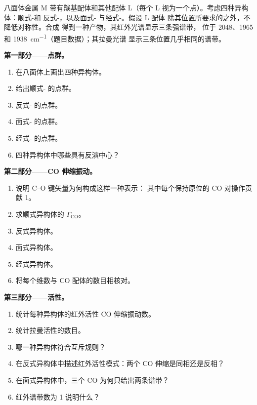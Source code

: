 \begin{problem}
\label{pb:b3:group-theory-applied:1}
八面体金属 M 带有羰基配体和其他配体 L（每个 L
视为一个点）。考虑四种异构体：顺式-和
反式-，以及面式- 与经式-。假设 L 配体
除其位置所要求的之外，不降低对称性。合成
 得到一种产物，其红外光谱显示三条强谱带，
位于 2048、1965 和 \qty{1938}{cm^{-1}}（题目数据）；其拉曼光谱
显示三条位置几乎相同的谱带。

\medskip\noindent\textbf{第一部分——点群。}
\begin{enumerate}
  \item 在八面体上画出四种异构体。
  \item 给出顺式- 的点群。
  \item 反式- 的点群。
  \item 面式- 的点群。
  \item 经式- 的点群。
  \item 四种异构体中哪些具有反演中心？
\end{enumerate}

\medskip\noindent\textbf{第二部分——CO 伸缩振动。}
\begin{enumerate}[resume]
  \item 说明 C--O 键矢量为何构成这样一种表示：
        其中每个保持原位的 CO 对操作贡献 1。
  \item 求顺式异构体的 $\Gamma_{\mathrm{CO}}$。
  \item 反式异构体。
  \item 面式异构体。
  \item 经式异构体。
  \item 将每个维数与 CO 配体的数目相核对。
\end{enumerate}

\medskip\noindent\textbf{第三部分——活性。}
\begin{enumerate}[resume]
  \item 统计每种异构体的红外活性 CO 伸缩振动数。
  \item 统计拉曼活性的数目。
  \item 哪一种异构体符合互斥规则？
  \item 在反式异构体中描述红外活性模式：两个 CO
        伸缩是同相还是反相？
  \item 在面式异构体中，三个 CO 为何只给出两条谱带？
  \item 红外谱带数为 1 说明什么？
\end{enumerate}


\end{problem}
